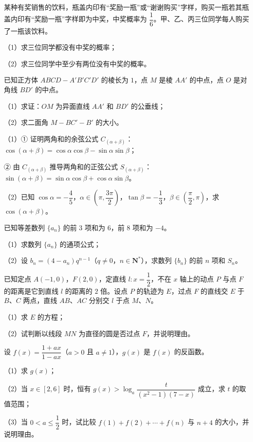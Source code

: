 \begin{question}
某种有奖销售的饮料，瓶盖内印有“奖励一瓶”或“谢谢购买”字样，购买一瓶若其瓶盖内印有“奖励一瓶”字样即为中奖，中奖概率为 $\dfrac16$。甲、乙、丙三位同学每人购买了一瓶该饮料。

（1）求三位同学都没有中奖的概率；

（2）求三位同学中至少有两位没有中奖的概率。

\Needspace{0.4\textheight}
\end{question}
\begingroup
\renewenvironment{question}{\Needspace{0.5\textheight}}{}
\begin{question}
已知正方体 $ABCD-A'B'C'D'$ 的棱长为 $1$，点 $M$ 是棱 $AA'$ 的中点，点 $O$ 是对角线 $BD'$ 的中点。

（1）求证：$OM$ 为异面直线 $AA'$ 和 $BD'$ 的公垂线；

（2）求二面角 $M-BC'-B'$ 的大小。
\nopagebreak[4]
\begin{center}\end{center}
\nopagebreak[4]
\end{question}
\endgroup
\begin{question}
（1）① 证明两角和的余弦公式 $C_{(\alpha+\beta)}$：$\cos(\alpha+\beta)=\cos\alpha\cos\beta-\sin\alpha\sin\beta$；

② 由 $C_{(\alpha+\beta)}$ 推导两角和的正弦公式 $S_{(\alpha+\beta)}$：$\sin(\alpha+\beta)=\sin\alpha\cos\beta+\cos\alpha\sin\beta$。

（2）已知 $\cos\alpha=-\dfrac45$，$\alpha\in\left(\pi,\dfrac{3\pi}2\right)$，$\tan\beta=-\dfrac13$，$\beta\in\left(\dfrac\pi2,\pi\right)$，求 $\cos(\alpha+\beta)$。

\end{question}
\begin{question}
已知等差数列 $\{a_n\}$ 的前 $3$ 项和为 $6$，前 $8$ 项和为 $-4$。

（1）求数列 $\{a_n\}$ 的通项公式；

（2）设 $b_n=(4-a_n)q^{n-1}$（$q\neq0$，$n\in\mathbf N^*$），求数列 $\{b_n\}$ 的前 $n$ 项和 $S_n$。

\end{question}
\begin{question}
已知定点 $A(-1,0)$，$F(2,0)$，定直线 $l:x=\dfrac12$，不在 $x$ 轴上的动点 $P$ 与点 $F$ 的距离是它到直线 $l$ 的距离的 $2$ 倍。设点 $P$ 的轨迹为 $E$，过点 $F$ 的直线交 $E$ 于 $B$、$C$ 两点，直线 $AB$、$AC$ 分别交 $l$ 于点 $M$、$N$。

（1）求 $E$ 的方程；

（2）试判断以线段 $MN$ 为直径的圆是否过点 $F$，并说明理由。

\end{question}
\begin{question}
设 $f(x)=\dfrac{1+ax}{1-ax}$（$a>0$ 且 $a\neq1$），$g(x)$ 是 $f(x)$ 的反函数。

（1）求 $g(x)$；

（2）当 $x\in[2,6]$ 时，恒有 $g(x)>\log_a\dfrac{t}{(x^2-1)(7-x)}$ 成立，求 $t$ 的取值范围；

（3）当 $0<a\leqslant\dfrac12$ 时，试比较 $f(1)+f(2)+\cdots+f(n)$ 与 $n+4$ 的大小，并说明理由。

\end{question}